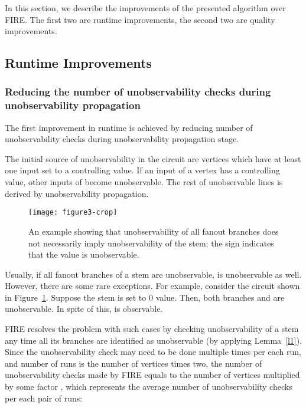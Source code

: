 \documentclass[conference]{IEEEtran} \usepackage{times}
\begin{document}
In this section, we describe the improvements of the presented algorithm over FIRE.
The first two are runtime improvements, the second two are quality
improvements.

\subsection{Runtime Improvements}

\subsubsection{Reducing the number of unobservability checks during
unobservability propagation} \label{r1}

The first improvement in runtime is achieved by reducing number of
unobservability checks during unobservability propagation stage.

The initial source of unobservability in the circuit are vertices
which have at least one input set to a controlling value.  If an input
of a vertex  has a controlling value, other inputs of  become
unobservable. The rest of unobservable lines is derived by
unobservability propagation.


\begin{figure}[t!]
\begin{center}
\texttt{[image: figure3-crop]}
\caption{An example showing that 
unobservability of all fanout branches does not necessarily imply
unobservability of the stem; the sign  indicates that the value
is unobservable.} \label{ex1}
\end{center}
\end{figure}


Usually, if all fanout branches of a stem  are unobservable,  is
unobservable as well. However, there are some rare exceptions.  For
example, consider the circuit shown in Figure~\ref{ex1}. Suppose the
stem  is set to 0 value.  Then, both branches  and  are
unobservable. In spite of this,  is observable.


FIRE resolves the problem with such cases by checking unobservability
of a stem  any time all its branches are identified as
unobservable (by applying Lemma~\ref{l1}).  Since
the unobservability check may need to be done multiple times per each
run, and number of runs is the number of vertices times two, the
number of unobservability checks made by FIRE equals to the number of
vertices multiplied by some factor , which represents the average
number of unobservability checks per each pair of runs:
\end{document}
